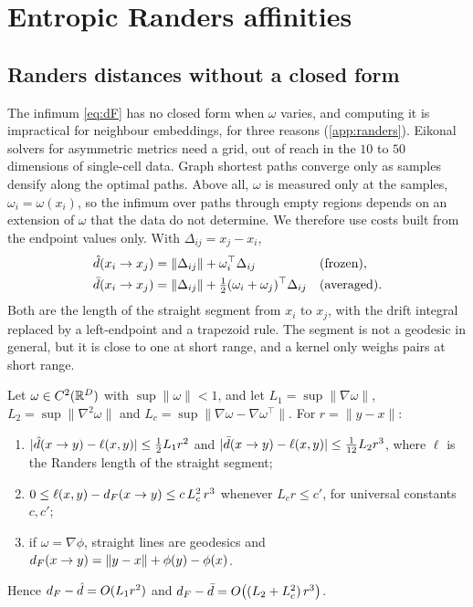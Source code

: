 \section{Entropic Randers affinities}
\label{sec:randers}

\subsection{Randers distances without a closed form}
\label{sec:approx}

The infimum \eqref{eq:dF} has no closed form when $\omega$ varies, and
computing it is impractical for neighbour embeddings, for three reasons
(\cref{app:randers}). Eikonal solvers for asymmetric metrics
\citep{sethian2003ordered,mirebeau2014efficient} need a grid, out of reach
in the $10$ to $50$ dimensions of single-cell data. Graph shortest paths
\citep{tenenbaum2000global} converge only as samples densify along the
optimal paths. Above all, $\omega$ is measured only at the samples,
$\omega_i=\omega(x_i)$, so the infimum over paths through empty regions
depends on an extension of $\omega$ that the data do not determine. We
therefore use costs built from the endpoint values only. With
$\Delta_{ij}=x_j-x_i$,
\begin{align}
  \hat d(x_i\to x_j)&=\|\Delta_{ij}\|+\omega_i^\top\Delta_{ij}
  &&\text{(frozen)},\label{eq:frozen}\\
  \bar d(x_i\to x_j)&=\|\Delta_{ij}\|+\tfrac12(\omega_i+\omega_j)^\top\Delta_{ij}
  &&\text{(averaged)}.\label{eq:averaged}
\end{align}
Both are the length of the straight segment from $x_i$ to $x_j$, with the
drift integral replaced by a left-endpoint and a trapezoid rule. The
segment is not a geodesic in general, but it is close to one at short
range, and a kernel only weighs pairs at short range.

\begin{proposition}
  \label{prop:approx}
  Let $\omega\in C^2(\mathbb{R}^D)$ with $\sup\|\omega\|<1$, and let
  $L_1=\sup\|\nabla\omega\|$, $L_2=\sup\|\nabla^2\omega\|$ and
  $L_c=\sup\|\nabla\omega-\nabla\omega^\top\|$. For $r=\|y-x\|$:
  \begin{enumerate}
    \item $|\hat d(x\to y)-\ell(x,y)|\le\tfrac12L_1r^2$ and
      $|\bar d(x\to y)-\ell(x,y)|\le\tfrac1{12}L_2r^3$, where $\ell$ is the
      Randers length of the straight segment;
    \item $0\le\ell(x,y)-d_F(x\to y)\le c\,L_c^2\,r^3$ whenever
      $L_cr\le c'$, for universal constants $c,c'$;
    \item if $\omega=\nabla\phi$, straight lines are geodesics and
      $d_F(x\to y)=\|y-x\|+\phi(y)-\phi(x)$.
  \end{enumerate}
  Hence $d_F-\hat d=O(L_1r^2)$ and $d_F-\bar d=O\big((L_2+L_c^2)\,r^3\big)$.
\end{proposition}

